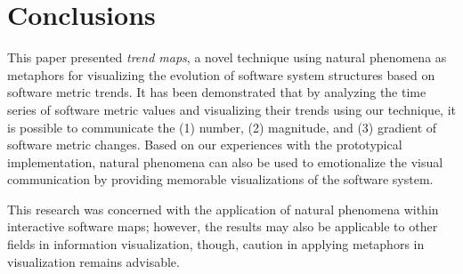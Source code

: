 
\section{Conclusions}
\label{sec:conclusions}
\noindent
This paper presented \emph{trend maps}, a novel technique using natural phenomena as metaphors for visualizing the evolution of software system structures based on software metric trends.
It has been demonstrated that by analyzing the time series of software metric values and visualizing their trends using our technique, it is possible to communicate the (1) number, (2) magnitude, and (3) gradient of software metric changes. 
Based on our experiences with the prototypical implementation, natural phenomena can also be used to emotionalize the visual communication by providing memorable visualizations of the software system. 

This research was concerned with the application of natural phenomena within interactive software maps; however, the results may also be applicable to other fields in information visualization, though, caution in applying metaphors in visualization remains advisable.
